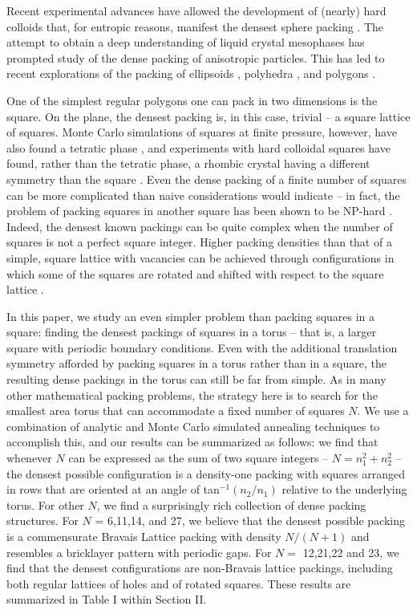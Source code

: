 \documentclass[preprint,aps]{revtex4}
\begin{document}
Recent experimental advances have allowed the development of (nearly) hard colloids that, for entropic reasons, manifest the densest sphere packing \cite{Pusey1986}. The attempt to obtain a deep understanding of liquid crystal mesophases has prompted study of the dense packing of anisotropic particles. This has led to recent explorations of the packing of ellipsoids \cite{Donev2004,Ras2011}, polyhedra \cite{ROAN,BAKER}, and polygons \cite{STROOBANTS}.

One of the simplest regular polygons one can pack in two dimensions is the square. On the plane, the densest packing is, in this case, trivial -- a square lattice of squares. Monte Carlo simulations of squares at finite pressure, however, have also found a tetratic phase \cite{Donev2006}, and experiments with hard colloidal squares have found, rather than the tetratic phase, a rhombic crystal having a different symmetry than the square \cite{Zhao2011}. Even the dense packing of a finite number of squares can be more complicated than naive considerations would indicate -- in fact, the problem of packing squares in another square has been shown to be NP-hard \cite{Leung1990}. Indeed, the densest known packings can be quite complex \cite{ERDOS1975,Friedman2002} when the number of squares is not a perfect square integer. Higher packing densities than that of a simple, square lattice with vacancies can be achieved through configurations in which some of the squares are rotated and shifted with respect to the square lattice \cite{Friedman2002}.

In this paper, we study an even simpler problem than packing squares in a square: finding the densest packings of squares in a torus -- that is, a larger square with periodic boundary conditions. Even with the additional translation symmetry afforded by packing squares in a torus rather than in a square, the resulting dense packings in the torus can still be far from simple. As in many other mathematical packing problems, the strategy here is to search for the smallest area torus that can accommodate a fixed number of squares $N$.  We use a combination of analytic and Monte Carlo simulated annealing techniques to accomplish this, and our results can be summarized as follows: we find that whenever $N$ can be expressed as the sum of two square integers -- $N=n_1^2+n_2^2$ -- the densest possible configuration is a density-one packing with squares arranged in rows that are oriented at an angle of tan$^{-1}(n_2/n_1)$ relative to the underlying torus.  For other $N$, we find a surprisingly rich collection of dense packing structures. For $N$ = 6,11,14, and 27, we believe that the densest possible packing is a commensurate Bravais Lattice packing with density $N/(N+1)$ and resembles a bricklayer pattern with periodic gaps.  For $N=$ 12,21,22 and 23, we find that the densest configurations are non-Bravais lattice packings, including both regular lattices of holes and of rotated squares. These results are summarized in Table I within Section II.
\end{document}
